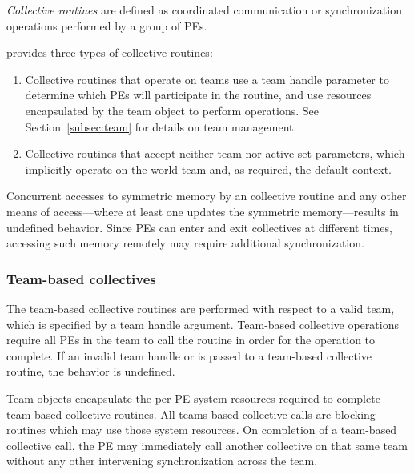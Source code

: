 \emph{Collective routines} are defined as coordinated communication or synchronization
operations performed by a group of \acp{PE}.

\openshmem provides three types of collective routines:

\begin{enumerate}
\item Collective routines that operate on teams use a team handle parameter to determine
  which \acp{PE} will participate in the routine, and use resources encapsulated by the team object
  to perform operations. See Section~\ref{subsec:team} for details on team management.


\item Collective routines that accept neither team nor active set
  parameters, which implicitly operate on the world team and, as
  required, the default context.
\end{enumerate}

Concurrent accesses to symmetric memory by an \openshmem collective
routine and any other means of access---where at least one updates the
symmetric memory---results in undefined behavior.
Since \acp{PE} can enter and exit collectives at different times,
accessing such memory remotely may require additional synchronization.

\subsubsection*{Team-based collectives}

The team-based collective routines are performed with respect to a valid
\openshmem team, which is specified by a team handle argument.
Team-based collective operations require all \acp{PE} in the team to call
the routine in order for the operation to complete. If an invalid team handle
or  is passed to a team-based collective
routine, the behavior is undefined.

Team objects encapsulate the per \ac{PE} system resources required to complete
team-based collective routines.
All \openshmem teams-based collective calls are blocking routines which may use those
system resources. On completion of a team-based collective call, the \ac{PE} may
immediately call another collective on that same team without any other intervening
synchronization across the team.

